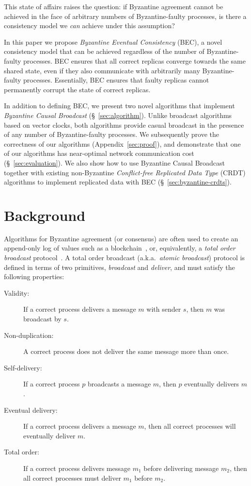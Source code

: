 \documentclass[a4paper,anonymous,USenglish]{lipics-v2019}
\begin{document}
This state of affairs raises the question: if Byzantine agreement cannot be achieved in the face of arbitrary numbers of Byzantine-faulty processes, is there a consistency model we \emph{can} achieve under this assumption?

In this paper we propose \emph{Byzantine Eventual Consistency} (BEC), a novel consistency model that can be achieved regardless of the number of Byzantine-faulty processes.
BEC ensures that all correct replicas converge towards the same shared state, even if they also communicate with arbitrarily many Byzantine-faulty processes.
Essentially, BEC ensures that faulty replicas cannot permanently corrupt the state of correct replicas.

In addition to defining BEC, we present two novel algorithms that implement \emph{Byzantine Causal Broadcast} (\S~\ref{sec:algorithm}). 
Unlike broadcast algorithms based on vector clocks, both algorithms provide casual broadcast in the presence of any number of Byzantine-faulty processes.
We subsequently prove the correctness of our algorithms (Appendix~\ref{sec:proof}), and demonstrate that one of our algorithms has near-optimal network communication cost (\S~\ref{sec:evaluation}).
We also show how to use Byzantine Causal Broadcast together with existing non-Byzantine \emph{Conflict-free Replicated Data Type} (CRDT) algorithms to implement replicated data with BEC (\S~\ref{sec:byzantine-crdts}).


\section{Background}\label{sec:background}

Algorithms for Byzantine agreement (or consensus) are often used to create an append-only log of values such as a blockchain~\cite{Bano:2019}, or, equivalently, a \emph{total order broadcast} protocol~\cite{Cachin:2011wt,Defago:2004ji}.
A total order broadcast (a.k.a.\ \emph{atomic broadcast}) protocol is defined in terms of two primitives, \emph{broadcast} and \emph{deliver}, and must satisfy the following properties:

\begin{description}
\item[Validity:] If a correct process delivers a message $m$ with sender $s$, then $m$ was broadcast by $s$.
\item[Non-duplication:] A correct process does not deliver the same message more than once.
\item[Self-delivery:] If a correct process $p$ broadcasts a message $m$, then $p$ eventually delivers $m$.
\item[Eventual delivery:] If a correct process delivers a message $m$, then all correct processes will eventually deliver $m$.
\item[Total order:] If a correct process delivers message $m_1$ before delivering message $m_2$, then all correct processes must deliver $m_1$ before $m_2$.
\end{description}
\end{document}
